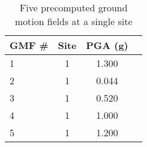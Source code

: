 \begin{table}[htbp]

\centering
\begin{tabular}{ l c c l }

\hline
\rowcolor{anti-flashwhite}
\bf{GMF \#} & \bf{Site} & \bf{PGA (g)}\\
\hline
1 & 1 & 1.300 \\
2 & 1 & 0.044 \\
3 & 1 & 0.520 \\
4 & 1 & 1.000 \\
5 & 1 & 1.200 \\
\hline
\end{tabular}

\caption{Five precomputed ground motion fields at a single site}
\label{tab:gmfs-diff-l1-5}
\end{table}